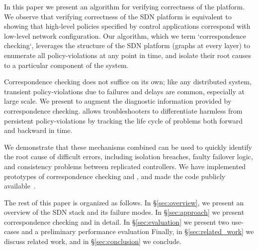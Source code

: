 In this paper we present an algorithm for verifying correctness of the
platform. We observe that verifying correctness of the SDN platform
is equivalent to showing that high-level policies specified by
control applications correspond with low-level network configuration.
Our algorithm, which we term `correspondence checking`,
leverages the structure of the SDN platform (graphs at every layer)
to enumerate all policy-violations at any point in time, and isolate their
root causes to a particular component of the system.

Correspondence checking does not suffice on its own; like any distributed
system, transient policy-violations due to failures and delays are 
common, especially at large scale. We present \simulator{}
to augment the diagnostic information provided by correspondence checking.
\Simulator{} allows troubleshooters 
to differentiate harmless from persistent policy-violations by tracking the life cycle of problems 
both forward and backward in time.

We demonstrate that these mechanisms combined can be used to quickly
identify the root cause of difficult errors, including isolation breaches,
faulty failover logic, and consistency problems between replicated
controllers. We have implemented prototypes
of correspondence checking and \simulator{}, and made the code publicly
available~\cite{github}.

The rest of this paper is organized as follows. In \S\ref{sec:overview},
we present an overview of the SDN stack and its failure modes.
In \S\ref{sec:approach} we present correspondence checking and
\simulator{} in detail. In \S\ref{sec:evaluation} we present
two use-cases and a preliminary performance evaluation
Finally, in \S\ref{sec:related_work} we discuss related work,
and in \S\ref{sec:conclusion} we conclude.
